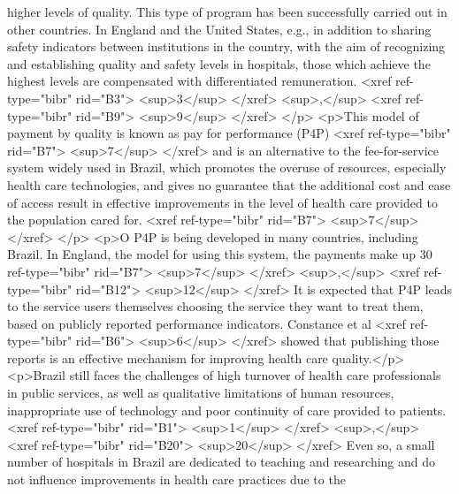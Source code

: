           higher levels of quality. This type of program has been successfully carried out in other
          countries. In England and the United States, e.g., in addition to sharing safety
          indicators between institutions in the country, with the aim of recognizing and
          establishing quality and safety levels in hospitals, those which achieve the highest
          levels are compensated with differentiated remuneration. <xref ref-type="bibr" rid="B3">
            <sup>3</sup>
          </xref>
          <sup>,</sup>
          <xref ref-type="bibr" rid="B9">
            <sup>9</sup>
          </xref>
        </p>
        <p>This model of payment by quality is known as pay for performance (P4P) <xref
            ref-type="bibr" rid="B7">
            <sup>7</sup>
          </xref> and is an alternative to the fee-for-service system widely used in Brazil, which
          promotes the overuse of resources, especially health care technologies, and gives no
          guarantee that the additional cost and ease of access result in effective improvements in
          the level of health care provided to the population cared for. <xref ref-type="bibr"
            rid="B7">
            <sup>7</sup>
          </xref>
        </p>
        <p>O P4P is being developed in many countries, including Brazil. In England, the model for
          using this system, the payments make up 30%
            ref-type="bibr" rid="B7">
            <sup>7</sup>
          </xref>
          <sup>,</sup>
          <xref ref-type="bibr" rid="B12">
            <sup>12</sup>
          </xref> It is expected that P4P leads to the service users themselves choosing the service
          they want to treat them, based on publicly reported performance indicators. Constance et
          al <xref ref-type="bibr" rid="B6">
            <sup>6</sup>
          </xref> showed that publishing those reports is an effective mechanism for improving
          health care quality.</p>
        <p>Brazil still faces the challenges of high turnover of health care professionals in public
          services, as well as qualitative limitations of human resources, inappropriate use of
          technology and poor continuity of care provided to patients. <xref ref-type="bibr"
            rid="B1">
            <sup>1</sup>
          </xref>
          <sup>,</sup>
          <xref ref-type="bibr" rid="B20">
            <sup>20</sup>
          </xref> Even so, a small number of hospitals in Brazil are dedicated to teaching and
          researching and do not influence improvements in health care practices due to the
